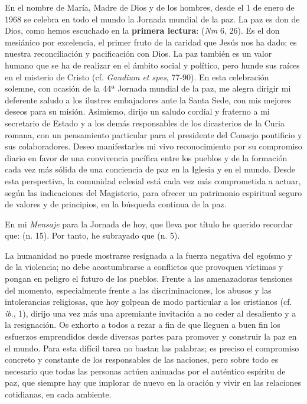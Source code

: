 \begin{body}
	En el nombre de María, Madre de Dios y de los hombres, desde el 1 de enero de 1968 se celebra en todo el mundo la Jornada mundial de la paz. La paz es don de Dios, como hemos escuchado en la \textbf{primera lectura}:  (\emph{Nm} 6, 26). Es el don mesiánico por excelencia, el primer fruto de la caridad que Jesús nos ha dado; es nuestra reconciliación y pacificación con Dios. La paz también es un valor humano que se ha de realizar en el ámbito social y político, pero hunde sus raíces en el misterio de Cristo (cf. \emph{Gaudium et spes}, 77-90). En esta celebración solemne, con ocasión de la 44ª Jornada mundial de la paz, me alegra dirigir mi deferente saludo a los ilustres embajadores ante la Santa Sede, con mis mejores deseos para su misión. Asimismo, dirijo un saludo cordial y fraterno a mi secretario de Estado y a los demás responsables de los dicasterios de la Curia romana, con un pensamiento particular para el presidente del Consejo pontificio  y sus colaboradores. Deseo manifestarles mi vivo reconocimiento por su compromiso diario en favor de una convivencia pacífica entre los pueblos y de la formación cada vez más sólida de una conciencia de paz en la Iglesia y en el mundo. Desde esta perspectiva, la comunidad eclesial está cada vez más comprometida a actuar, según las indicaciones del Magisterio, para ofrecer un patrimonio espiritual seguro de valores y de principios, en la búsqueda continua de la paz.
	
	En mi \emph{Mensaje} para la Jornada de hoy, que lleva por título  he querido recordar que:  (n. 15). Por tanto, he subrayado que  (n. 5).
	
	La humanidad no puede mostrarse resignada a la fuerza negativa del egoísmo y de la violencia; no debe acostumbrarse a conflictos que provoquen víctimas y pongan en peligro el futuro de los pueblos. Frente a las amenazadoras tensiones del momento, especialmente frente a las discriminaciones, los abusos y las intolerancias religiosas, que hoy golpean de modo particular a los cristianos (cf. \emph{ib}., 1), dirijo una vez más una apremiante invitación a no ceder al desaliento y a la resignación. Os exhorto a todos a rezar a fin de que lleguen a buen fin los esfuerzos emprendidos desde diversas partes para promover y construir la paz en el mundo. Para esta difícil tarea no bastan las palabras; es preciso el compromiso concreto y constante de los responsables de las naciones, pero sobre todo es necesario que todas las personas actúen animadas por el auténtico espíritu de paz, que siempre hay que implorar de nuevo en la oración y vivir en las relaciones cotidianas, en cada ambiente.
	

\end{body}
